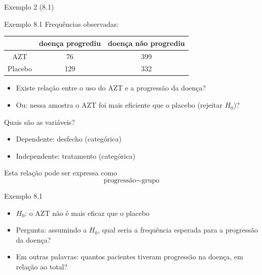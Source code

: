 \documentclass{beamer}
\begin{document}
\begin{frame}[label=exemplo8.1]{\scriptsize Exemplo 2 (8.1)}
  \begin{exampleblock}{Exemplo 8.1}
    \footnotesize
    Frequências observadas:
    \begin{tabular}{c|c|c}
      & doença progrediu & doença não progrediu\\
      \hline
      AZT & 76 & 399 \\
      \hline
      Placebo & 129 & 332 \\
    \end{tabular}
  \end{exampleblock}
  \vfill
  \begin{itemize}
    \footnotesize
  \item Existe relação entre o uso do AZT e a progressão da doença?
  \item Ou: nessa amostra o AZT foi mais eficiente que o placebo
    (rejeitar $H_0$)?
  \end{itemize}
\end{frame}

\begin{frame}{\scriptsize Quais são as variáveis?}
  \begin{itemize}
    \footnotesize
  \item Dependente: desfecho (categórica)
  \item Independente: tratamento (categórica)
  \end{itemize}
  \vfill
  \begin{block}{Esta relação pode ser expressa como}
    \begin{displaymath}
      \text{progressão} \sim \text{grupo}
    \end{displaymath}
  \end{block}
\end{frame}

\begin{frame}{\scriptsize Exemplo 8.1}
  \begin{itemize}
    \footnotesize
  \item $H_0$: o AZT não é mais eficaz que o placebo
  \item Pergunta: assumindo a $H_0$, qual seria a frequência esperada
    para a progressão da doença?
  \item Em outras palavras: quantos pacientes tiveram progressão na
    doença, em relação ao total?
  \end{itemize}
\end{frame}
\end{document}
